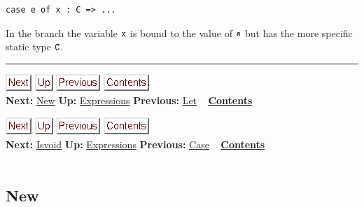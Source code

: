 \documentclass[]{article}
\begin{document}
\begin{verbatim}
case e of x : C => ...
\end{verbatim}

In the branch the variable $\tt x$ is bound to the value of $\tt e$ but
has the more specific static type $\tt C$.

\begin{center}\rule{3in}{0.4pt}\end{center}

\href{node23.html}{\includegraphics{next.png}}
\href{node13.html}{\includegraphics{up.png}}
\href{node21.html}{\includegraphics{prev.png}}
\href{node1.html}{\includegraphics{contents.png}} \\ \textbf{Next:}
\href{node23.html}{New} \textbf{Up:} \href{node13.html}{Expressions}
\textbf{Previous:} \href{node21.html}{Let} ~
\textbf{\href{node1.html}{Contents}}

\href{node24.html}{\includegraphics{next.png}}
\href{node13.html}{\includegraphics{up.png}}
\href{node22.html}{\includegraphics{prev.png}}
\href{node1.html}{\includegraphics{contents.png}} \\ \textbf{Next:}
\href{node24.html}{Isvoid} \textbf{Up:} \href{node13.html}{Expressions}
\textbf{Previous:} \href{node22.html}{Case} ~
\textbf{\href{node1.html}{Contents}} \\ \\

\subsection{New}
\end{document}
